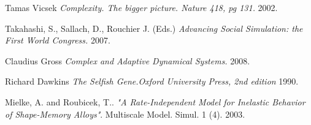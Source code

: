 \documentclass[11pt,oneside,a4paper,openright]{report}
\begin{document}
\begin{thebibliography}{13}
	Tamas Vicsek
	\emph{Complexity. The bigger picture. Nature 418, pg 131.}
	2002.	

	Takahashi, S., Sallach, D., Rouchier J. (Eds.)
	\emph{Advancing Social Simulation: the First World Congress.}
	2007.	

	Claudius Gross
	\emph{Complex and Adaptive Dynamical Systems.}
	2008.
	
	Richard Dawkins
	\emph{The Selfish Gene.Oxford University Press, 2nd edition}	
	1990.

	Mielke, A. and Roubicek, T.. 
	\emph{"A Rate-Independent Model for Inelastic Behavior of Shape-Memory Alloys"}. Multiscale Model. Simul. 1 (4). 
	2003.

\end{thebibliography}
\end{document}

